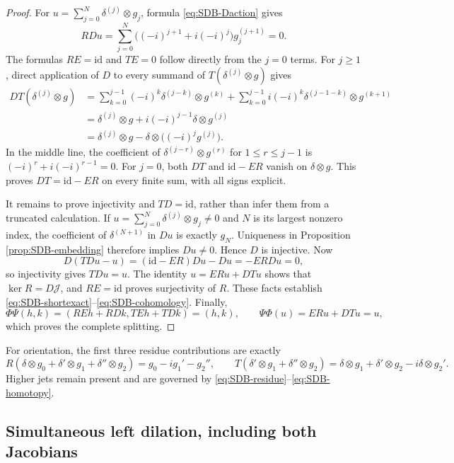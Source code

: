 \begin{proof}
For $u=\sum_{j=0}^N\delta^{(j)}\otimes g_j$, formula
\eqref{eq:SDB-Daction} gives
\[
 RD u=\sum_{j=0}^N
      \bigl((-i)^{j+1}+i(-i)^j\bigr)g_j^{(j+1)}=0.
\]
The formulas $RE=\mathrm{id}$ and $TE=0$ follow directly from the
$j=0$ terms. For $j\geq1$, direct application of $D$ to every
summand of $T(\delta^{(j)}\otimes g)$ gives
\[
 \begin{aligned}
 DT(\delta^{(j)}\otimes g)
 &=\sum_{k=0}^{j-1}(-i)^k
        \delta^{(j-k)}\otimes g^{(k)}
    +\sum_{k=0}^{j-1}i(-i)^k
        \delta^{(j-1-k)}\otimes g^{(k+1)}\\
 &=\delta^{(j)}\otimes g
       +i(-i)^{j-1}\delta\otimes g^{(j)}\\
 &=\delta^{(j)}\otimes g
       -\delta\otimes\bigl((-i)^j g^{(j)}\bigr).
 \end{aligned}
\]
In the middle line, the coefficient of
$\delta^{(j-r)}\otimes g^{(r)}$ for $1\leq r\leq j-1$
is $(-i)^r+i(-i)^{r-1}=0$. For $j=0$, both $DT$ and
$\mathrm{id}-ER$ vanish on $\delta\otimes g$. This proves
$DT=\mathrm{id}-ER$ on every finite sum, with all signs explicit.

It remains to prove injectivity and $TD=\mathrm{id}$, rather than
infer them from a truncated calculation. If
$u=\sum_{j=0}^N\delta^{(j)}\otimes g_j\ne0$ and $N$ is its largest
nonzero index, the coefficient of $\delta^{(N+1)}$ in $Du$ is
exactly $g_N$. Uniqueness in Proposition \ref{prop:SDB-embedding}
therefore implies $Du\ne0$. Hence $D$ is injective. Now
\[
 D(TDu-u)=(\mathrm{id}-ER)Du-Du=-ERDu=0,
\]
so injectivity gives $TDu=u$. The identity
$u=ERu+DTu$ shows that $\ker R=D\mathcal J$, and $RE=\mathrm{id}$
proves surjectivity of $R$. These facts establish
\eqref{eq:SDB-shortexact}--\eqref{eq:SDB-cohomology}.
Finally,
\[
 \Phi\Psi(h,k)=(REh+RDk,TEh+TDk)=(h,k),\qquad
 \Psi\Phi(u)=ERu+DTu=u,
\]
which proves the complete splitting.
\end{proof}

For orientation, the first three residue contributions are exactly
\begin{equation}\tag{SDB17}\label{eq:SDB-firstjets}
 R(\delta\otimes g_0+\delta'\otimes g_1+\delta''\otimes g_2)
      =g_0-i g_1'-g_2'',\qquad
 T(\delta'\otimes g_1+\delta''\otimes g_2)
      =\delta\otimes g_1+\delta'\otimes g_2
           -i\delta\otimes g_2'.
\end{equation}
Higher jets remain present and are governed by
\eqref{eq:SDB-residue}--\eqref{eq:SDB-homotopy}.

\subsection{Simultaneous left dilation, including both Jacobians}

